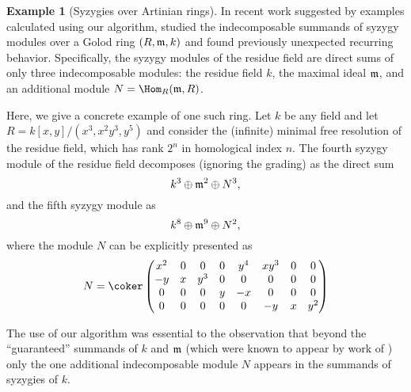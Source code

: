 \documentclass[12pt]{article}
\theoremstyle{theorem}
\numberwithin{thm}{section}
\theoremstyle{definition}
\newtheorem{exa}[thm]{Example}
\newcommand{\mahrud}[1]{{\color{ForestGreen} \sf $\blacklozenge$ Mahrud: [#1]}}
\begin{document}
\begin{exa}[Syzygies over Artinian rings]
  In recent work suggested by examples calculated using our algorithm, \cite{CDE24} studied the indecomposable summands of syzygy modules over a Golod ring $(R,\mathfrak m,k)$ and found previously unexpected recurring behavior. Specifically, the syzygy modules of the residue field are direct sums of only three indecomposable modules: the residue field $k$, the maximal ideal $\mathfrak m$, and an additional module $N = \Hom_R(\m, R)$.

  Here, we give a concrete example of one such ring. Let $k$ be any field and let $R = k[x,y]/(x^3,x^2y^3,y^5)$ and consider the (infinite) minimal free resolution of the residue field, which has rank $2^n$ in homological index $n$.   The fourth syzygy module of the residue field decomposes (ignoring the grading) as the direct sum
  $$ k^3 \oplus \mathfrak m^2 \oplus N^3, $$
  and the fifth syzygy module as
  $$ k^8\oplus \mathfrak m^9 \oplus N^2, $$
  where the module $N$ can be explicitly presented as
  \[ N = \coker
  \begin{pmatrix}
    x^{2}&0&0&0&y^{4}&xy^{3}&0&0\\
    -y&x&y^{3}&0&0&0&0&0\\
    0&0&0&y&-x&0&0&0\\
    0&0&0&0&0&-y&x&y^{2}
  \end{pmatrix} \]

  The use of our algorithm was essential to the observation that beyond the ``guaranteed'' summands of $k$ and $\mathfrak m$ (which were known to appear by work of \cite{DE23}) only the one additional indecomposable module $N$ appears in the summands of syzygies of $k$.
\end{exa}

\end{document}

